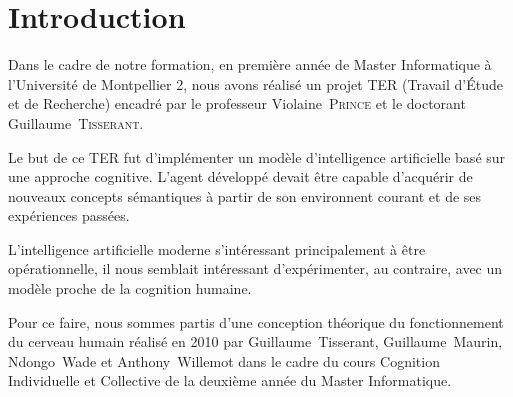 \chapter*{Introduction}
Dans le cadre de notre formation, en première année de Master Informatique à
l'Université de Montpellier 2, nous avons réalisé un projet TER (Travail
d'Étude et de Recherche) encadré par le professeur \mbox{Violaine
\textsc{Prince}} et le doctorant \mbox{Guillaume \textsc{Tisserant}}.

Le but de ce TER fut d'implémenter un modèle d'intelligence artificielle basé
sur une approche cognitive. L'agent développé devait être capable d'acquérir de
nouveaux concepts sémantiques à partir de son environnent courant et de ses
expériences passées.

L'intelligence artificielle moderne s'intéressant principalement à être
opérationnelle, il nous semblait intéressant d'expérimenter, au contraire, avec
un modèle proche de la cognition humaine.

Pour ce faire, nous sommes partis d'une conception théorique du fonctionnement
du cerveau humain réalisé en 2010 par \mbox{Guillaume Tisserant},
\mbox{Guillaume Maurin}, \mbox{Ndongo Wade} et \mbox{Anthony Willemot} dans le
cadre du cours \og Cognition Individuelle et Collective\fg{} de la deuxième
année du Master Informatique.


